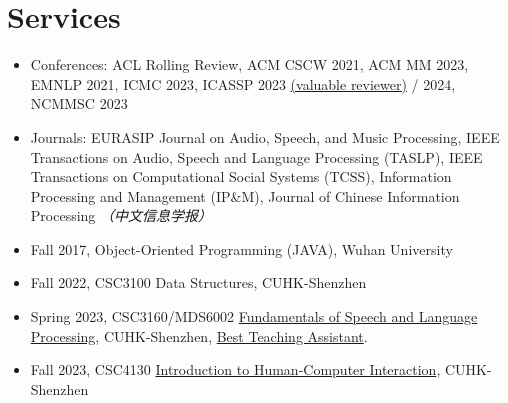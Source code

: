 \documentclass{resume}
\begin{document}
\section{Services}
\begin{itemize}
  \item Conferences: ACL Rolling Review, ACM CSCW 2021, ACM MM 2023, EMNLP 2021, ICMC 2023, ICASSP 2023
        \href{https://www.zhangxueyao.com/data/presentations/2023_icassp_reviewer.pdf}{(valuable
          reviewer)} / 2024, NCMMSC 2023
  \item Journals: EURASIP Journal on Audio, Speech, and Music Processing, IEEE
        Transactions on Audio, Speech and Language Processing (TASLP), IEEE
        Transactions on Computational Social Systems (TCSS), Information Processing and
        Management (IP\&M), Journal of Chinese Information Processing \textit{（中文信息学报）}
\end{itemize}
\begin{itemize}
  \item Fall 2017, Object-Oriented Programming (JAVA), Wuhan University
  \item Fall 2022, CSC3100 Data Structures, CUHK-Shenzhen
  \item Spring 2023, CSC3160/MDS6002
        \href{https://drwuz.com/CSC3160/index.html}{Fundamentals of Speech and Language
          Processing}, CUHK-Shenzhen,
        \href{https://www.zhangxueyao.com/data/presentations/20230521_ta_award.pdf}{Best
          Teaching Assistant}.
  \item Fall 2023, CSC4130 \href{https://stevenhan1991.github.io/CSC4130/index.html}{Introduction to Human-Computer Interaction}, CUHK-Shenzhen
\end{itemize}
\end{document}
